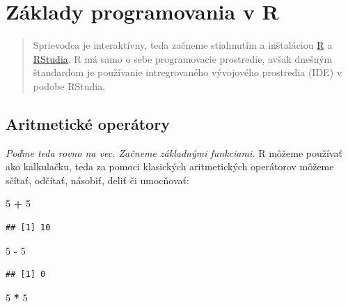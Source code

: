 \documentclass[]{article}
\newenvironment{Shaded}{\begin{snugshade}}{\end{snugshade}}
\newcommand{\DecValTok}[1]{\textcolor[rgb]{0.00,0.00,0.81}{#1}}
\newcommand{\OperatorTok}[1]{\textcolor[rgb]{0.81,0.36,0.00}{\textbf{#1}}}
\newcommand{\StringTok}[1]{\textcolor[rgb]{0.31,0.60,0.02}{#1}}
\begin{document}
\newpage

\hypertarget{zuxe1klady-programovania-v-r}{%
\section{Základy programovania v R}\label{zuxe1klady-programovania-v-r}}

\begin{quote}
Sprievodca je interaktívny, teda začneme stiahnutím a inštaláciou
\href{https://cran.r-project.org/mirrors.html}{R} a
\href{https://cran.r-project.org/mirrors.html}{RStudia}. R má samo o
sebe programovacie prostredie, avšak dnešným štandardom je používanie
intregrovaného vývojového prostredia (IDE) v podobe RStudia.
\end{quote}

\hypertarget{aritmetickuxe9-operuxe1tory}{%
\subsection{Aritmetické operátory}\label{aritmetickuxe9-operuxe1tory}}

\emph{Poďme teda rovno na vec. Začneme základnými funkciami.} R môžeme
používať ako kalkulačku, teda za pomoci klasických aritmetických
operátorov môžeme sčítať, odčítať, násobiť, deliť či umocňovať:

\begin{Shaded}
\begin{Highlighting}[]
\DecValTok{5} \OperatorTok{+}\StringTok{ }\DecValTok{5}
\end{Highlighting}
\end{Shaded}

\begin{verbatim}
## [1] 10
\end{verbatim}

\begin{Shaded}
\begin{Highlighting}[]
\DecValTok{5} \OperatorTok{-}\StringTok{ }\DecValTok{5}
\end{Highlighting}
\end{Shaded}

\begin{verbatim}
## [1] 0
\end{verbatim}

\begin{Shaded}
\begin{Highlighting}[]
\DecValTok{5} \OperatorTok{*}\StringTok{ }\DecValTok{5}
\end{Highlighting}
\end{Shaded}
\end{document}
